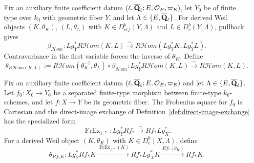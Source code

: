 
\begin{definition}
\label{def:weil-internal-hom-object}


Fix an auxiliary finite coefficient datum
\((\ell,\overline{\mathbf Q}_\ell;E,\mathcal O_E,\varpi_E)\), let \(Y_0\) be of finite type
over \(k_0\) with geometric fiber \(Y\), and let
\(\Lambda\in\{E,\overline{\mathbf Q}_\ell\}\).  For derived Weil objects
\((K,\theta_K)\), \((L,\theta_L)\) with
\(K\in D^b_{ctf}(Y,\Lambda)\) and \(L\in D^b_c(Y,\Lambda)\), pullback gives
\[
 \beta_{\mathcal H om}:Lg_Y^*R\mathcal Hom(K,L)
 \xrightarrow{\sim}R\mathcal Hom(Lg_Y^*K,Lg_Y^*L).
\]
Contravariance in the first variable forces the inverse of \(\theta_K\).
Define
\[
 \theta_{R\mathcal Hom(K,L)}:=
 R\mathcal Hom(\theta_K^{-1},\theta_L)\circ\beta_{\mathcal H om}:
 Lg_Y^*R\mathcal Hom(K,L)\xrightarrow{\sim}R\mathcal Hom(K,L).
\]
\end{definition}


\begin{definition}
\label{def:weil-direct-image-object}


Fix an auxiliary finite coefficient datum
\((\ell,\overline{\mathbf Q}_\ell;E,\mathcal O_E,\varpi_E)\) and let
\(\Lambda\in\{E,\overline{\mathbf Q}_\ell\}\).  Let \(f_0:X_0\to Y_0\) be a separated
finite-type morphism between finite-type \(k_0\)-schemes, and let
\(f:X\to Y\) be its geometric fiber.
The Frobenius square for \(f_0\) is Cartesian and the direct-image exchange
of Definition~\ref{def:direct-image-exchange} has the specialized form
\[
 \operatorname{FrEx}_{f,*}:Lg_Y^*Rf_*\xrightarrow{\sim}Rf_*Lg_X^*.
\]
For a derived Weil object \((K,\theta_K)\) with
\(K\in D^b_c(X,\Lambda)\), define
\[
 \theta_{Rf_*K}:Lg_Y^*Rf_*K
 \xrightarrow{\operatorname{FrEx}_{f,*}(K)}Rf_*Lg_X^*K
 \xrightarrow{Rf_*(\theta_K)}Rf_*K.
\]
\end{definition}


